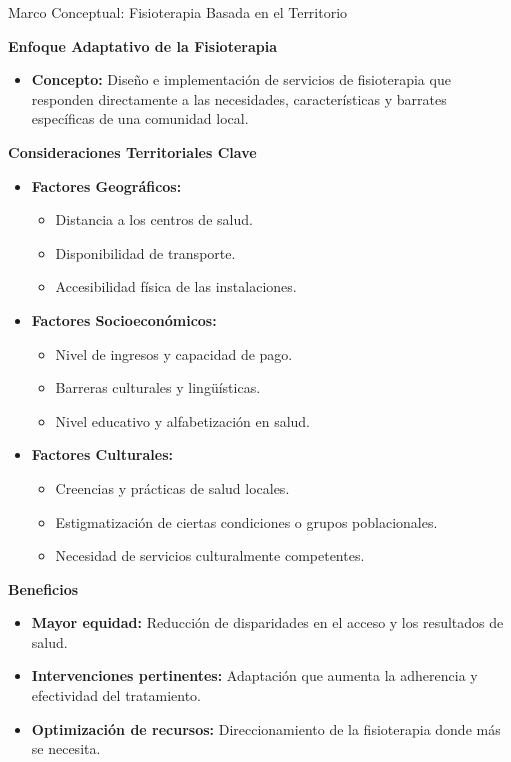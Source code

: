 \documentclass[aspectratio=169]{beamer}
\begin{document}
\begin{frame}{Marco Conceptual: Fisioterapia Basada en el Territorio}


\textbf{Enfoque Adaptativo de la Fisioterapia}
\begin{itemize}
  \item \textbf{Concepto:} Diseño e implementación de servicios de fisioterapia que responden directamente a las necesidades, características y barrates específicas de una comunidad local.
\end{itemize}
\textbf{Consideraciones Territoriales Clave}
\begin{itemize}
  \item \textbf{Factores Geográficos:}
  \begin{itemize}
    \item Distancia a los centros de salud.
    \item Disponibilidad de transporte.
    \item Accesibilidad física de las instalaciones.
  \end{itemize}
  \item \textbf{Factores Socioeconómicos:}
  \begin{itemize}
    \item Nivel de ingresos y capacidad de pago.
    \item Barreras culturales y lingüísticas.
    \item Nivel educativo y alfabetización en salud.
  \end{itemize}
  \item \textbf{Factores Culturales:}
  \begin{itemize}
    \item Creencias y prácticas de salud locales.
    \item Estigmatización de ciertas condiciones o grupos poblacionales.
    \item Necesidad de servicios culturalmente competentes.
  \end{itemize}
\end{itemize}
\textbf{Beneficios}
\begin{itemize}
  \item \textbf{Mayor equidad:} Reducción de disparidades en el acceso y los resultados de salud.
  \item \textbf{Intervenciones pertinentes:} Adaptación que aumenta la adherencia y efectividad del tratamiento.
  \item \textbf{Optimización de recursos:} Direccionamiento de la fisioterapia donde más se necesita.
\end{itemize}
\end{frame}
\end{document}
